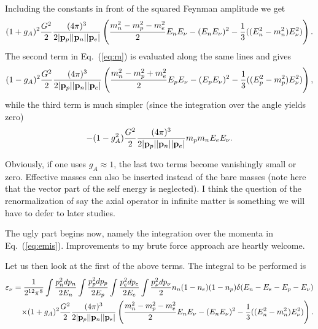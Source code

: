 Including the constants in front of the squared Feynman amplitude we get
\begin{equation}
    (1+g_A)^2\frac{G^2}{2}\frac{(4\pi)^3}{2|{\bf p}_p||{\bf p}_n||{\bf p}_e|}
    \left(\frac{m_n^2-m_p^2-m_e^2}{2}E_nE_{\nu}  - (E_nE_{\nu})^2-
     \frac{1}{3}((E_n^2-m_n^2)E_{\nu}^2)\right).
     \label{eq:firstterm}
\end{equation}
The second term in Eq.\ (\ref{eq:m}) is evaluated along the same lines and gives
\begin{equation}
    (1-g_A)^2\frac{G^2}{2}\frac{(4\pi)^3}{2|{\bf p}_p||{\bf p}_n||{\bf p}_e|}
    \left(\frac{m_n^2-m_p^2+m_e^2}{2}E_pE_{\nu}  - (E_pE_{\nu})^2-
     \frac{1}{3}((E_p^2-m_p^2)E_{\nu}^2)\right),
     \label{eq:secondterm}
\end{equation}
while the third term is much simpler (since the integration over the angle
yields zero)
\begin{equation}
    -(1-g_A^2)\frac{G^2}{2}\frac{(4\pi)^3}{2|{\bf p}_p||{\bf p}_n||{\bf p}_e|}
    m_pm_nE_eE_{\nu}.
     \label{eq:thirdterm}
\end{equation}

Obviously, if one uses $g_A \approx 1$, the last two terms become
vanishingly small or zero. Effective masses can also be inserted 
instead of the bare masses (note here that the vector part of the self energy
is neglected). I think the question of the renormalization of say the axial
operator in infinite matter is something we will have to defer to later
studies.

The ugly part begins now, namely the integration over the momenta in Eq.\ (\ref{eq:emis}).
Improvements to my brute force approach are heartly welcome.

Let us then look at the first of the above terms.
The integral to be performed is
\begin{eqnarray}
      \varepsilon_{\nu}=\frac{1}{2^{12}\pi^8}\int \frac{p_n^2dp_n}{2E_n}
                  \int \frac{p_p^2dp_p}{2E_p}\int \frac{p_e^2dp_e}{2E_e}
                  \int \frac{p_{\nu}^2dp_{\nu}}{2}
                  n_n(1-n_e)(1-n_p)\delta (E_n-E_e-E_p-E_{\nu})  \cr
      \times (1+g_A)^2\frac{G^2}{2}\frac{(4\pi)^3}{2|{\bf p}_p||{\bf p}_n||{\bf p}_e|}
      \left(\frac{m_n^2-m_p^2-m_e^2}{2}E_nE_{\nu}  - (E_nE_{\nu})^2-
       \frac{1}{3}((E_n^2-m_n^2)E_{\nu}^2)\right).
      \label{eq:emis2}
\end{eqnarray}


